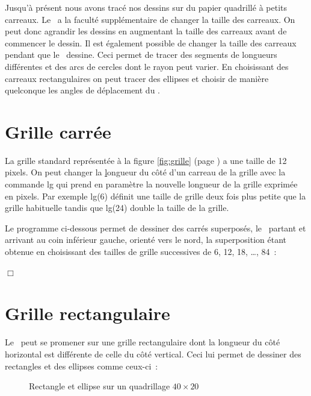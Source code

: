 Jusqu'à présent nous avons tracé nos dessins sur du papier quadrillé à petits carreaux.
Le \robot\ a la faculté supplémentaire de changer la taille des carreaux. 
On peut donc agrandir les dessins en augmentant la taille des carreaux avant de commencer le dessin. Il est également possible 
de changer la taille des carreaux pendant que le \robot\ dessine. Ceci permet de
tracer des segments de longueurs différentes et des arcs de cercles dont le rayon peut varier. 
En choisissant des carreaux rectangulaires on peut tracer des ellipses et choisir
de manière quelconque les angles de déplacement du \robot.

\section{Grille carrée}
La grille standard représentée à la figure \ref{fig:grille} (page \pageref{fig:grille})
a une taille de 12 pixels. On peut changer la 
\underline{l}ongueur du côté d'un carreau de la \underline{g}rille avec la commande {\idt lg} qui
prend en paramètre la nouvelle longueur de la grille exprimée en pixels. Par exemple
{\idt lg(6)} définit une taille de grille deux fois plus petite que la grille habituelle tandis que 
{\idt lg(24)} double la taille de la grille.

\begin{exemple}{\rm
 Le programme ci-dessous permet de des\-si\-ner des carrés superposés, le \robot\ partant
 et arrivant au coin inférieur gauche, orienté vers le nord, la superposition étant
 obtenue en choisissant des tailles de grille successives de 6, 12, 18, \ldots, 84~:
 
 
\noindent $\Box$ }\end{exemple}


\section{Grille rectangulaire}

Le \robot\ peut se promener sur une grille rectangulaire dont la longueur du côté
horizontal est différente de celle du côté
vertical. Ceci lui per\-met de des\-sin\-er des rec\-tan\-gles et des el\-lip\-ses com\-me ceux-ci~:
\begin{figure}[htbp]
 \caption{Rectangle et ellipse sur un quadrillage $40 \times 20$}
\end{figure}

